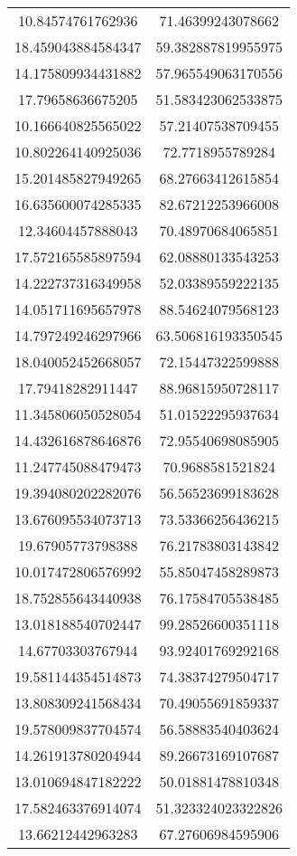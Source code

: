 \begin{table}
\begin{tabular}{cc}
10.84574761762936 & 71.46399243078662 \\
18.459043884584347 & 59.382887819955975 \\
14.175809934431882 & 57.965549063170556 \\
17.79658636675205 & 51.583423062533875 \\
10.166640825565022 & 57.21407538709455 \\
10.802264140925036 & 72.7718955789284 \\
15.201485827949265 & 68.27663412615854 \\
16.635600074285335 & 82.67212253966008 \\
12.34604457888043 & 70.48970684065851 \\
17.572165585897594 & 62.08880133543253 \\
14.222737316349958 & 52.03389559222135 \\
14.051711695657978 & 88.54624079568123 \\
14.797249246297966 & 63.506816193350545 \\
18.040052452668057 & 72.15447322599888 \\
17.79418282911447 & 88.96815950728117 \\
11.345806050528054 & 51.01522295937634 \\
14.432616878646876 & 72.95540698085905 \\
11.247745088479473 & 70.9688581521824 \\
19.394080202282076 & 56.56523699183628 \\
13.676095534073713 & 73.53366256436215 \\
19.67905773798388 & 76.21783803143842 \\
10.017472806576992 & 55.85047458289873 \\
18.752855643440938 & 76.17584705538485 \\
13.018188540702447 & 99.28526600351118 \\
14.67703303767944 & 93.92401769292168 \\
19.581144354514873 & 74.38374279504717 \\
13.808309241568434 & 70.49055691859337 \\
19.578009837704574 & 56.58883540403624 \\
14.261913780204944 & 89.26673169107687 \\
13.010694847182222 & 50.01881478810348 \\
17.582463376914074 & 51.323324023322826 \\
13.66212442963283 & 67.27606984595906 \\

\end{tabular}
\end{table}
